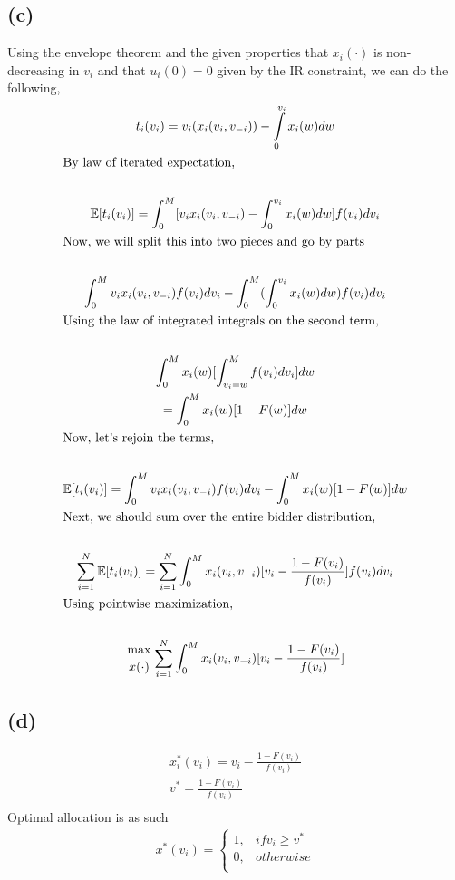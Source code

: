 \documentclass[10pt,a4paper]{article}
\begin{document}
  \subsection*{(c)}
    Using the envelope theorem and the given properties that $x_i(\cdot)$ 
    is non-decreasing in $v_i$ and that $u_i(0) = 0$ given by the IR 
    constraint, we can do the following,
    \begin{gather*}
      t_i(v_i) = v_i(x_i(v_i, v_{-i})) - \int\limits_0^{v_i}x_i(w)dw \\
      \shortintertext{By law of iterated expectation,} \\
      \mathbb{E}[t_i(v_i)] =\int_0^M[v_ix_i(v_i,v_{-i}) - \int_0^{v_i}x_i(w)dw]f(v_i)dv_i \\
      \shortintertext{Now, we will split this into two pieces and go by parts} \\
      \int_0^Mv_ix_i(v_i,v_{-i})f(v_i)dv_i - 
      \int_0^M(\int_0^{v_i}x_i(w)dw)f(v_i)dv_i \\
      \shortintertext{Using the law of integrated integrals on the second term,} \\
      \int_0^Mx_i(w)[\int_{v_i=w}^Mf(v_i)dv_i]dw \\
      = \int_0^Mx_i(w)[1-F(w)]dw \\
      \shortintertext{Now, let's rejoin the terms,} \\
      \mathbb{E}[t_i(v_i)] = \int_0^Mv_ix_i(v_i,v_{-i})f(v_i)dv_i -
      \int_0^Mx_i(w)[1-F(w)]dw \\
      \shortintertext{Next, we should sum over the entire bidder 
      distribution,} \\
      \sum^N_{i=1}\mathbb{E}[t_i(v_i)] = 
      \sum^N_{i=1}\int_0^Mx_i(v_i, v_{-i})[v_i - \frac{1-
      F(v_i)}{f(v_i)}]f(v_i)dv_i \\
      \shortintertext{Using pointwise maximization,} \\
      {\max\atop{x(\cdot)}}\sum^N_{i=1}\int_0^Mx_i(v_i, v_{-i})[v_i - 
      \frac{1-F(v_i)}{f(v_i)}] \\
    \end{gather*}
  \subsection*{(d)}
    \begin{gather*}
      x_i^*(v_i) = v_i - \frac{1-F(v_i)}{f(v_i)} \\
      v^* = \frac{1-F(v_i)}{f(v_i)} \\
    \end{gather*}
    Optimal allocation is as such
    \begin{gather*}
      x^*(v_i) = \begin{cases}
        1, & if v_i\geq v^* \\
        0, & otherwise \\
      \end{cases}
    \end{gather*}
\end{document}
